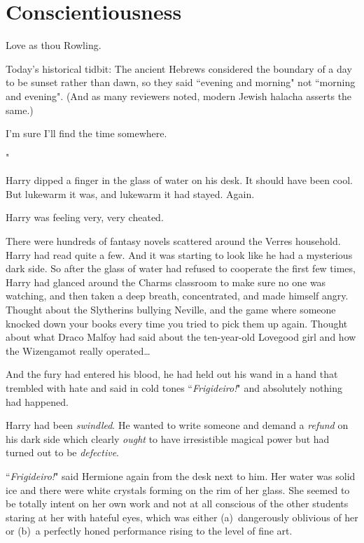 \chapter{Conscientiousness}

\begin{chapterOpeningAuthorNote}
Love as thou Rowling.

Today's historical tidbit: The ancient Hebrews considered the boundary of a day to be sunset rather than dawn, so they said ``evening and morning" not ``morning and evening". (And as many reviewers noted, modern Jewish halacha asserts the same.)
\end{chapterOpeningAuthorNote}
\begin{chapterOpeningQuote}
I'm sure I'll find the time somewhere.
\end{chapterOpeningQuote}

"

\hplettrineextrapara
Harry dipped a finger in the glass of water on his desk. It should have been cool. But lukewarm it was, and lukewarm it had stayed. Again.

Harry was feeling very, very cheated.

There were hundreds of fantasy novels scattered around the Verres household. Harry had read quite a few. And it was starting to look like he had a mysterious dark side. So after the glass of water had refused to cooperate the first few times, Harry had glanced around the Charms classroom to make sure no one was watching, and then taken a deep breath, concentrated, and made himself angry. Thought about the Slytherins bullying Neville, and the game where someone knocked down your books every time you tried to pick them up again. Thought about what Draco Malfoy had said about the ten-year-old Lovegood girl and how the Wizengamot really operated{\ldots}

And the fury had entered his blood, he had held out his wand in a hand that trembled with hate and said in cold tones ``\emph{Frigideiro!}" and absolutely nothing had happened.

Harry had been \emph{swindled}. He wanted to write someone and demand a \emph{refund} on his dark side which clearly \emph{ought} to have irresistible magical power but had turned out to be \emph{defective}.

``\emph{Frigideiro!}" said Hermione again from the desk next to him. Her water was solid ice and there were white crystals forming on the rim of her glass. She seemed to be totally intent on her own work and not at all conscious of the other students staring at her with hateful eyes, which was either (a)~dangerously oblivious of her or (b)~a perfectly honed performance rising to the level of fine art.

